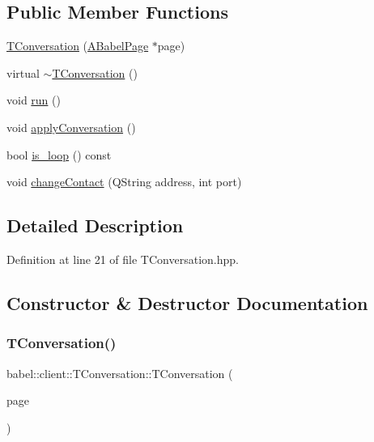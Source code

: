 \subsection*{Public Member Functions}
\begin{DoxyCompactItemize}
\item 
\mbox{\hyperlink{classbabel_1_1client_1_1_t_conversation_a634068f86938c367def4667f1878dc55}{T\+Conversation}} (\mbox{\hyperlink{classbabel_1_1client_1_1_a_babel_page}{A\+Babel\+Page}} $\ast$page)
\item 
virtual \mbox{\hyperlink{classbabel_1_1client_1_1_t_conversation_aad2dd8f379f5d1c9788e1529a24c96a3}{$\sim$\+T\+Conversation}} ()
\item 
void \mbox{\hyperlink{classbabel_1_1client_1_1_t_conversation_ab0a3324f0b8035495c48cf45d97d0ccd}{run}} ()
\item 
void \mbox{\hyperlink{classbabel_1_1client_1_1_t_conversation_a074db94766570fa34b503baac6d67008}{apply\+Conversation}} ()
\item 
bool \mbox{\hyperlink{classbabel_1_1client_1_1_t_conversation_a6dedd929e9338f84480f23d3674be25d}{is\+\_\+loop}} () const
\item 
void \mbox{\hyperlink{classbabel_1_1client_1_1_t_conversation_a44c07d53a365ecfe1967d74569da15f3}{change\+Contact}} (Q\+String address, int port)
\end{DoxyCompactItemize}


\subsection{Detailed Description}


Definition at line 21 of file T\+Conversation.\+hpp.



\subsection{Constructor \& Destructor Documentation}
\mbox{\label{classbabel_1_1client_1_1_t_conversation_a634068f86938c367def4667f1878dc55}} 
\subsubsection{\texorpdfstring{T\+Conversation()}{TConversation()}}
{\footnotesize\ttfamily babel\+::client\+::\+T\+Conversation\+::\+T\+Conversation (\begin{DoxyParamCaption}\item[{\mbox{\hyperlink{classbabel_1_1client_1_1_a_babel_page}{A\+Babel\+Page}} $\ast$}]{page }\end{DoxyParamCaption})}




